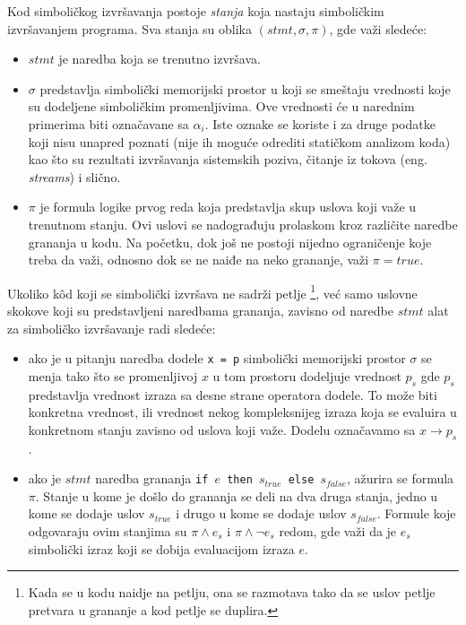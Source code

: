 \documentclass[12pt,oneside]{memoir}
\begin{document}
Kod simboličkog izvršavanja postoje \textit{stanja} koja nastaju simboličkim izvršavanjem programa. Sva stanja su oblika $(stmt, \sigma, \pi)$, gde važi sledeće:

\begin{itemize}
    \item $stmt$ je naredba koja se trenutno izvršava.
    
    \item $\sigma$ predstavlja simbolički memorijski prostor u koji se smeštaju vrednosti koje su dodeljene simboličkim promenljivima. Ove vrednosti će u narednim primerima biti označavane sa $\alpha_i$. Iste oznake se koriste i za druge podatke koji nisu unapred poznati (nije ih moguće odrediti statičkom analizom koda) kao što su rezultati izvršavanja sistemskih poziva, čitanje iz tokova (eng. \textit{streams}) i slično.
    
    \item $\pi$ je formula logike prvog reda koja predstavlja skup uslova koji važe u trenutnom stanju. Ovi uslovi se nadograđuju prolaskom kroz različite naredbe grananja u kodu. Na početku, dok još ne postoji nijedno ograničenje koje treba da važi, odnosno dok se ne naiđe na neko grananje, važi $\pi = true$. 
\end{itemize}

Ukoliko k\^od koji se simbolički izvršava ne sadrži petlje \footnote[1]{Kada se u kodu naidje na petlju, ona se razmotava tako da se uslov petlje pretvara u grananje a kod petlje se duplira.}, već samo uslovne skokove koji su predstavljeni naredbama grananja, zavisno od naredbe $stmt$ alat za simboličko izvršavanje radi sledeće:

\begin{itemize}
    \item ako je u pitanju naredba dodele \texttt{x = p} simbolički memorijski prostor $\sigma$ se menja tako što se promenljivoj $x$ u tom prostoru dodeljuje vrednost $p_s$ gde $p_s$ predstavlja vrednost izraza sa desne strane operatora dodele. To može biti konkretna vrednost, ili vrednost nekog kompleksnijeg izraza koja se evaluira u konkretnom stanju zavisno od uslova koji važe. Dodelu označavamo sa $x \rightarrow p_s$.
    
    \item ako je $stmt$ naredba grananja \texttt{if $e$ then $s_{true}$ else $s_{false}$}, ažurira se formula $\pi$. Stanje u kome je došlo do grananja se deli na dva druga stanja, jedno u kome se dodaje uslov $s_{true}$ i drugo u kome se dodaje uslov $s_{false}$. Formule koje odgovaraju ovim stanjima su $\pi \land e_s$ i $\pi \land \neg e_s$ redom, gde važi da je $e_s$ simbolički izraz koji se dobija evaluacijom izraza $e$.
\end{itemize}
\end{document}
